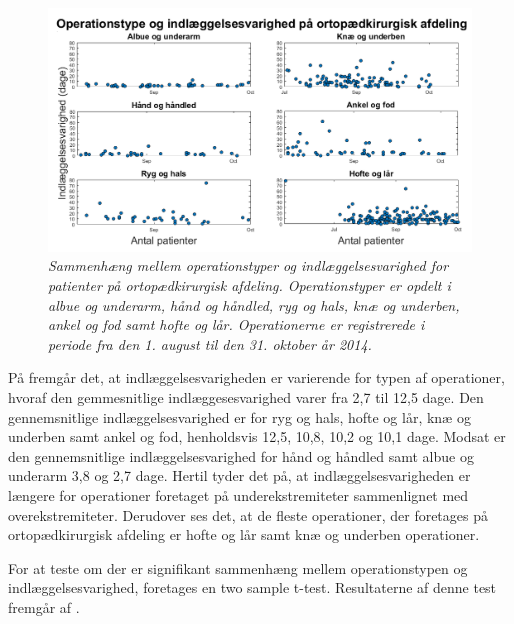 \begin{figure}[H]
	\centering
	\includegraphics[scale=0.5]{figures/operaogindlaeg}
	\caption{\textit{Sammenhæng mellem operationstyper og indlæggelsesvarighed for patienter på ortopædkirurgisk afdeling. Operationstyper er opdelt i albue og underarm, hånd og håndled, ryg og hals, knæ og underben, ankel og fod samt hofte og lår. Operationerne er registrerede i periode fra den 1. august til den 31. oktober år 2014.}}
	\label{opvsindlaegtid}
\end{figure}


\noindent
På  fremgår det, at indlæggelsesvarigheden er varierende for typen af operationer, hvoraf den gemmesnitlige indlæggesesvarighed varer fra 2,7 til 12,5 dage. Den gennemsnitlige indlæggelsesvarighed er for ryg og hals, hofte og lår, knæ og underben samt ankel og fod, henholdsvis 12,5, 10,8, 10,2 og 10,1 dage. Modsat er den gennemsnitlige indlæggelsesvarighed for hånd og håndled samt albue og underarm 3,8 og 2,7 dage. Hertil tyder det på, at indlæggelsesvarigheden er længere for operationer foretaget på underekstremiteter sammenlignet med overekstremiteter. Derudover ses det, at de fleste operationer, der foretages på ortopædkirurgisk afdeling er hofte og lår samt knæ og underben operationer. 

For at teste om der er signifikant sammenhæng mellem operationstypen og indlæggelsesvarighed, foretages en two sample t-test. Resultaterne af denne test fremgår af .

